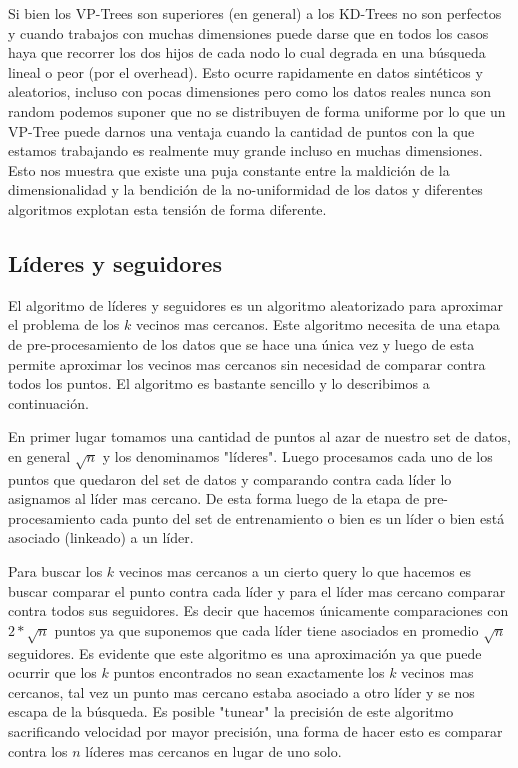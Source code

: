 Si bien los VP-Trees son superiores (en general) a los KD-Trees no son perfectos y cuando trabajos con muchas dimensiones puede darse que en todos los casos haya que recorrer los dos hijos de cada nodo lo cual degrada en una búsqueda lineal o peor (por el overhead). Esto ocurre rapidamente en datos sintéticos y aleatorios, incluso con pocas dimensiones pero como los datos reales nunca son random podemos suponer que no se distribuyen de forma uniforme por lo que un VP-Tree puede darnos una ventaja cuando la cantidad de puntos con la que estamos trabajando es realmente muy grande incluso en muchas dimensiones. Esto nos muestra que existe una puja constante entre la maldición de la dimensionalidad y la bendición de la no-uniformidad de los datos y diferentes algoritmos explotan esta tensión de forma diferente.

\subsection{Líderes y seguidores}

El algoritmo de líderes y seguidores es un algoritmo aleatorizado para aproximar el problema de los $k$ vecinos mas cercanos. Este algoritmo necesita de una etapa de pre-procesamiento de los datos que se hace una única vez y luego de esta permite aproximar los vecinos mas cercanos sin necesidad de comparar contra todos los puntos. El algoritmo es bastante sencillo y lo describimos a continuación.

En primer lugar tomamos una cantidad de puntos al azar de nuestro set de datos, en general $\sqrt{n}$ y los denominamos "líderes". Luego procesamos cada uno de los puntos que quedaron del set de datos y comparando contra cada líder lo asignamos al líder mas cercano. De esta forma luego de la etapa de pre-procesamiento cada punto del set de entrenamiento o bien es un líder o bien está asociado (linkeado) a un líder. 

Para buscar los $k$ vecinos mas cercanos a un cierto query lo que hacemos es buscar comparar el punto contra cada líder y para el líder mas cercano comparar contra todos sus seguidores. Es decir que hacemos únicamente comparaciones con $2*\sqrt{n}$ puntos ya que suponemos que cada líder tiene asociados en promedio $\sqrt{n}$ seguidores.  Es evidente que este algoritmo es una aproximación ya que puede ocurrir que los $k$ puntos encontrados no sean exactamente los $k$ vecinos mas cercanos, tal vez un punto mas cercano estaba asociado a otro líder y se nos escapa de la búsqueda. Es posible "tunear" la precisión de este algoritmo sacrificando velocidad por mayor precisión, una forma de hacer esto es comparar contra los $n$ líderes mas cercanos en lugar de uno solo.


